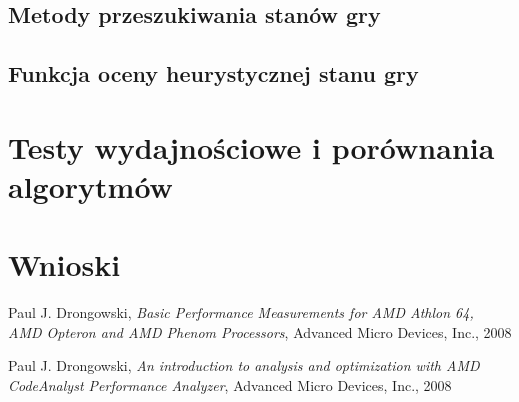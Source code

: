 \documentclass{scrartcl}
\begin{document}
\subsection{Metody przeszukiwania stanów gry}

\subsection{Funkcja oceny heurystycznej stanu gry}

\section{Testy wydajnościowe i porównania algorytmów}

\section{Wnioski}

\begin{thebibliography}{9}

 Paul J. Drongowski,
  \emph{Basic Performance Measurements for AMD Athlon 64, 
AMD Opteron and AMD Phenom Processors}, Advanced Micro Devices, Inc.,
  2008

 Paul J. Drongowski,
  \emph{An introduction to analysis and optimization 
with AMD CodeAnalyst Performance Analyzer}, Advanced Micro Devices, Inc.,
  2008

\end{thebibliography}
\end{document}
